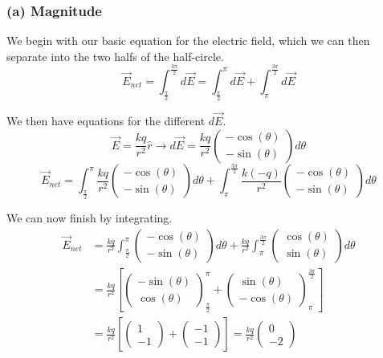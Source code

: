 \documentclass[12pt]{article}
\begin{document}
\subsubsection*{(a) Magnitude}
We begin with our basic equation for the electric field, which we can then separate into the two halfs of the half-circle.
\begin{equation*}
    \vec{E}_{net}   =   \int_{\frac{\pi}{2}}^{\frac{3\pi}{2}} d\vec{E}
        =   \int_{\frac{\pi}{2}}^{\pi} d\vec{E} + \int_{\pi}^{\frac{3\pi}{2}} d\vec{E}
\end{equation*}

We then have equations for the different $d\vec{E}$.
\[ \vec{E} = \frac{kq}{r^2}\hat{r} \rightarrow d\vec{E} = \frac{kq}{r^2}\begin{pmatrix} -\cos(\theta)\\ -\sin(\theta) \end{pmatrix} d\theta \]
\begin{equation*}
    \vec{E}_{net}   =   \int_{\frac{\pi}{2}}^{\pi} \frac{kq}{r^2}\begin{pmatrix} -\cos(\theta)\\ -\sin(\theta) \end{pmatrix} d\theta + \int_{\pi}^{\frac{3\pi}{2}} \frac{k(-q)}{r^2}\begin{pmatrix} -\cos(\theta)\\ -\sin(\theta) \end{pmatrix} d\theta
\end{equation*}

We can now finish by integrating.
\begin{align*}
    \vec{E}_{net}   &=  \frac{kq}{r^2} \int_{\frac{\pi}{2}}^{\pi} \begin{pmatrix} -\cos(\theta)\\ -\sin(\theta) \end{pmatrix} d\theta + \frac{kq}{r^2} \int_{\pi}^{\frac{3\pi}{2}} \begin{pmatrix} \cos(\theta)\\ \sin(\theta) \end{pmatrix} d\theta\\
        &=  \frac{kq}{r^2}\left[ \begin{pmatrix} -\sin(\theta)\\ \cos(\theta) \end{pmatrix}_{\frac{\pi}{2}}^{\pi} + \begin{pmatrix} \sin(\theta)\\ -\cos(\theta) \end{pmatrix}_{\pi}^{\frac{3\pi}{2}} \right]\\
        &=  \frac{kq}{r^2}\left[ \begin{pmatrix} 1\\ -1 \end{pmatrix} + \begin{pmatrix} -1 \\ -1 \end{pmatrix} \right]
        =   \frac{kq}{r^2}\begin{pmatrix} 0\\-2 \end{pmatrix}
\end{align*}
\end{document}
